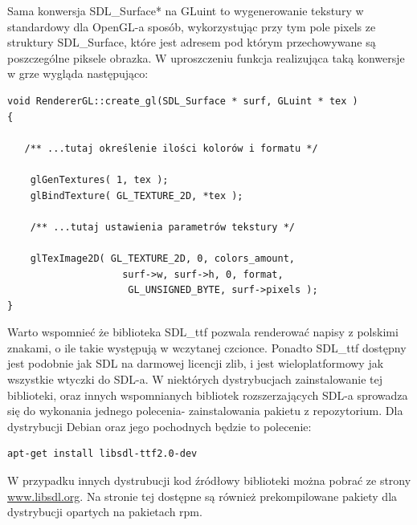 Sama konwersja SDL\_Surface* na GLuint to wygenerowanie tekstury w standardowy dla OpenGL-a sposób, wykorzystując przy tym pole pixels ze struktury SDL\_Surface, które jest adresem pod którym przechowywane są poszczególne piksele obrazka. W uproszczeniu funkcja realizująca taką konwersje w grze wygląda następująco:

\begingroup
\fontsize{10pt}{12pt}\selectfont
\begin{verbatim}  
void RendererGL::create_gl(SDL_Surface * surf, GLuint * tex )
{
 
   /** ...tutaj określenie ilości kolorów i formatu */
  
    glGenTextures( 1, tex );
    glBindTexture( GL_TEXTURE_2D, *tex );

    /** ...tutaj ustawienia parametrów tekstury */

    glTexImage2D( GL_TEXTURE_2D, 0, colors_amount,
    			  	surf->w, surf->h, 0, format, 
    			 	 GL_UNSIGNED_BYTE, surf->pixels );
}
\end{verbatim}
\endgroup

Warto wspomnieć że biblioteka SDL\_ttf pozwala renderować napisy z polskimi znakami, o ile takie występują w wczytanej czcionce. Ponadto SDL\_ttf dostępny jest podobnie jak SDL na darmowej licencji zlib, i jest wieloplatformowy jak wszystkie wtyczki do SDL-a. W niektórych dystrybucjach zainstalowanie tej biblioteki, oraz innych wspomnianych bibliotek rozszerzających SDL-a sprowadza się do wykonania jednego polecenia- zainstalowania pakietu z repozytorium. Dla dystrybucji Debian oraz jego pochodnych będzie to polecenie:
\begin{verbatim}
apt-get install libsdl-ttf2.0-dev 
\end{verbatim}

W przypadku innych dystrubucji kod źródłowy biblioteki można pobrać ze strony
\href{http://www.libsdl.org/projects/SDL_ttf/}{www.libsdl.org}.
Na stronie tej dostępne są również prekompilowane pakiety dla dystrybucji opartych na pakietach rpm.